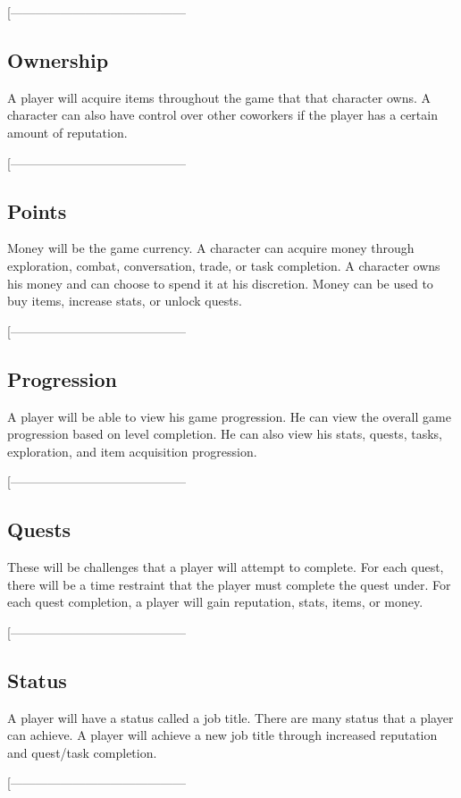 \documentclass[9pt]{article}
\begin{document}
[------------------------------------------
\smallskip


\subsection*{Ownership}
A player will acquire items throughout the game that that character owns. A character can also have control over other coworkers if the player has a certain amount of reputation.

[------------------------------------------
\smallskip


\subsection*{Points}
Money will be the game currency. A character can acquire money through exploration, combat, conversation, trade, or task completion. A character owns his money and can choose to spend it at his discretion. Money can be used to buy items, increase stats, or unlock quests.

[------------------------------------------
\smallskip


\subsection*{Progression}
A player will be able to view his game progression. He can view the overall game progression based on level completion. He can also view his stats, quests, tasks, exploration, and item acquisition progression.

[------------------------------------------
\smallskip


\subsection*{Quests}
These will be challenges that a player will attempt to complete. For each quest, there will be a time restraint that the player must complete the quest under. For each quest completion, a player will gain reputation, stats, items, or money.

[------------------------------------------
\smallskip


\subsection*{Status}
A player will have a status called a job title. There are many status that a player can achieve. A player will achieve a new job title through increased reputation and quest/task completion.

[------------------------------------------
\smallskip
\end{document}
